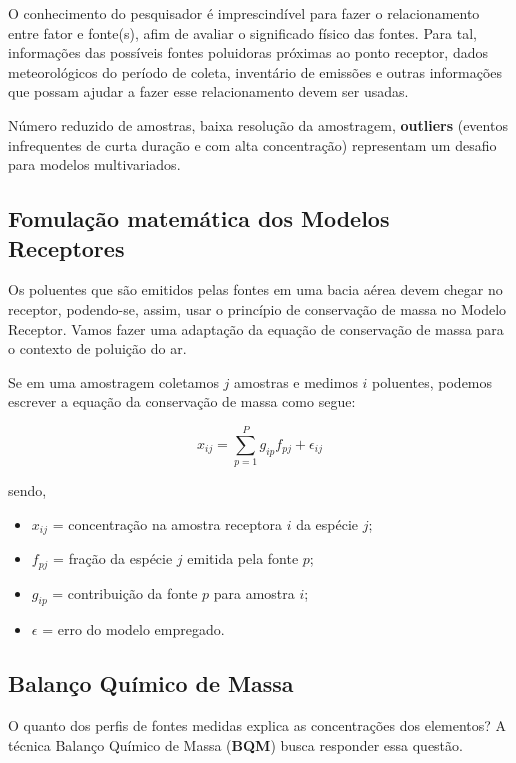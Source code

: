 O conhecimento do pesquisador é imprescindível para fazer o relacionamento 
entre fator e fonte(s), afim de avaliar o significado físico das fontes. 
Para tal, informações das possíveis fontes poluidoras próximas ao ponto 
receptor, dados meteorológicos do período de coleta, inventário de emissões 
e outras informações que possam ajudar a fazer esse relacionamento 
devem ser usadas.

Número reduzido de amostras, baixa resolução da amostragem, \textbf{outliers} 
(eventos infrequentes de curta duração e com alta concentração) representam 
um desafio para modelos multivariados.

\subsection{Fomulação matemática dos Modelos Receptores}

Os poluentes que são emitidos pelas fontes em uma bacia aérea devem chegar no 
receptor, podendo-se, assim, usar o princípio de conservação de massa no Modelo Receptor. 
Vamos fazer uma adaptação da equação de conservação de massa para o contexto 
de poluição do ar. 

Se em uma amostragem coletamos $j$ amostras e medimos $i$ poluentes, podemos 
escrever a equação da conservação de massa como segue: 

\begin{equation}
  x_{ij} = \sum_{p=1}^{P} g_{ip}f_{pj} + \epsilon_{ij}
\end{equation} 

sendo,
\begin{itemize}
  \item $x_{ij}$ = concentração na amostra receptora $i$ da espécie $j$;
  \item $f_{pj}$ = fração da espécie $j$ emitida pela fonte $p$;
  \item $g_{ip}$ = contribuição da fonte $p$ para amostra $i$;
  \item $\epsilon$ = erro do modelo empregado.
\end{itemize}

\subsection{Balanço Químico de Massa}

O quanto dos perfis de fontes medidas explica as concentrações dos elementos? 
A técnica Balanço Químico de Massa (\textbf{BQM}) busca responder essa questão.

